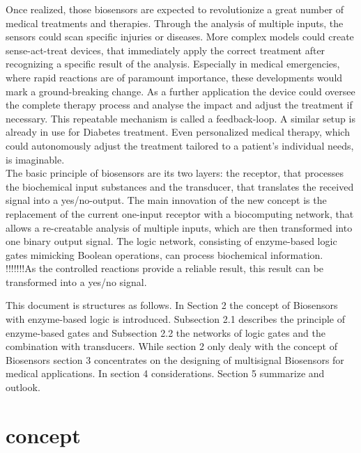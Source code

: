 \documentclass[runningheads]{llncs}
\begin{document}
	Once realized, those biosensors are expected to revolutionize a great number of medical treatments and therapies. Through the analysis of multiple inputs, the sensors could scan specific injuries or diseases. More complex models could create sense-act-treat devices, that immediately apply the correct treatment after recognizing a specific result of the analysis. Especially in medical emergencies, where rapid reactions are of paramount importance, these developments would mark a ground-breaking change. As a further application the device could oversee the complete therapy process and analyse the impact and adjust the treatment if necessary. This repeatable mechanism is called a feedback-loop. A similar setup is already in use for Diabetes treatment. Even personalized medical therapy, which could autonomously adjust the treatment tailored to a patient’s individual needs, is imaginable.\\
	
	The basic principle of biosensors are its two layers: the receptor, that processes the biochemical input substances and the transducer, that translates the received signal into a yes/no-output. The main innovation of the new concept is the replacement of the current one-input receptor with a biocomputing network, that allows a re-creatable analysis of multiple inputs, which are then transformed into one binary output signal. The logic network, consisting of enzyme-based logic gates mimicking Boolean operations, can process biochemical information.\\
	 
	!!!!!!!As the controlled reactions provide a reliable result, this result can be transformed into a yes/no signal.
	
	This document is structures as follows. In Section 2 the concept of Biosensors with enzyme-based logic is introduced. Subsection 2.1 describes the principle of enzyme-based gates and Subsection 2.2 the networks of logic gates and the combination with transducers. While section 2 only dealy with the concept of Biosensors section 3 concentrates on the designing of multisignal Biosensors for medical applications.
	In section 4 considerations. Section 5 summarize and outlook. 
	
	
	
	
	
\section{concept}
\end{document}
